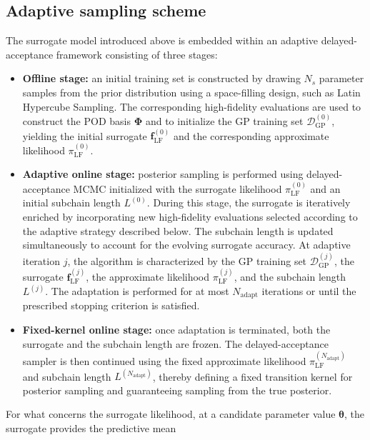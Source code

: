 \documentclass{elsarticle}
\begin{document}
\subsection{Adaptive sampling scheme}

The surrogate model introduced above is embedded within an adaptive delayed-acceptance framework consisting of three stages:

\begin{itemize}
    \item \textbf{Offline stage:} an initial training set is constructed by drawing $N_s$ parameter samples from the prior distribution using a space-filling design, such as Latin Hypercube Sampling. The corresponding high-fidelity evaluations are used to construct the POD basis $\mathbf{\Phi}$ and to initialize the GP training set
    $\mathcal{D}_{\mathrm{GP}}^{(0)}$, yielding the initial surrogate
    $\mathbf{f}_{\mathrm{LF}}^{(0)}$ and the corresponding approximate likelihood
    $\pi_{\mathrm{LF}}^{(0)}$.

    \item \textbf{Adaptive online stage:} posterior sampling is performed using delayed-acceptance MCMC initialized with the surrogate likelihood
    $\pi_{\mathrm{LF}}^{(0)}$ and an initial subchain length $L^{(0)}$. During this stage, the surrogate is iteratively enriched by incorporating new high-fidelity evaluations selected according to the adaptive strategy described below. The subchain length is updated simultaneously to account for the evolving surrogate accuracy. At adaptive iteration $j$, the algorithm is characterized by the GP training set $\mathcal{D}_{\mathrm{GP}}^{(j)}$, the surrogate $\mathbf{f}_{\mathrm{LF}}^{(j)}$, the approximate likelihood $\pi_{\mathrm{LF}}^{(j)}$, and the subchain length $L^{(j)}$. The adaptation is performed for at most $N_{\mathrm{adapt}}$ iterations or until the prescribed stopping criterion is satisfied.

    \item \textbf{Fixed-kernel online stage:} once adaptation is terminated, both the surrogate and the subchain length are frozen. The delayed-acceptance sampler is then continued using the fixed approximate likelihood
    $\pi_{\mathrm{LF}}^{(N_{\mathrm{adapt}})}$ and subchain length
    $L^{(N_{\mathrm{adapt}})}$, thereby defining a fixed transition kernel for posterior sampling and guaranteeing sampling from the true posterior.
\end{itemize}
For what concerns the surrogate likelihood, at a candidate parameter value $\boldsymbol{\theta}$, the surrogate provides the predictive mean
\end{document}
